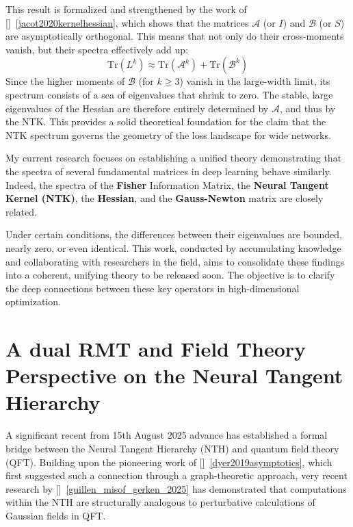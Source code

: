 This result is formalized and strengthened by the work of []~\ref{jacot2020kernelhessian}, which shows that the matrices $\mathcal{A}$ (or $I$) and $\mathcal{B}$ (or $S$) are asymptotically orthogonal. This means that not only do their cross-moments vanish, but their spectra effectively add up:
\begin{equation}
\mathrm{Tr}(L^k) \approx \mathrm{Tr}(\mathcal{A}^k) + \mathrm{Tr}(\mathcal{B}^k)
\end{equation}
Since the higher moments of $\mathcal{B}$ (for $k \ge 3$) vanish in the large-width limit, its spectrum consists of a sea of eigenvalues that shrink to zero. The stable, large eigenvalues of the Hessian are therefore entirely determined by $\mathcal{A}$, and thus by the NTK. This provides a solid theoretical foundation for the claim that the NTK spectrum governs the geometry of the loss landscape for wide networks.

\begin{tcolorbox}[colback=red!5,colframe=red!80!black,title={\textbf{Ongoing Research: Towards a Unified Spectral Theory}},enhanced,drop shadow,boxrule=2pt]
    My current research focuses on establishing a unified theory demonstrating that the spectra of several fundamental matrices in deep learning behave similarly. Indeed, the spectra of the \textbf{Fisher} Information Matrix, the \textbf{Neural Tangent Kernel (NTK)}, the \textbf{Hessian}, and the \textbf{Gauss-Newton} matrix are closely related.

    Under certain conditions, the differences between their eigenvalues are bounded, nearly zero, or even identical. This work, conducted by accumulating knowledge and collaborating with researchers in the field, aims to consolidate these findings into a coherent, unifying theory to be released soon. The objective is to clarify the deep connections between these key operators in high-dimensional optimization.
\end{tcolorbox}





\newpage

\section{A dual RMT and Field Theory Perspective on the Neural Tangent Hierarchy}

A significant recent from 15th August 2025 advance has established a formal bridge between the Neural Tangent Hierarchy (NTH) and quantum field theory (QFT). Building upon the pioneering work of []~\ref{dyer2019asymptotics}, which first suggested such a connection through a graph-theoretic approach, very recent research by []~\ref{guillen_misof_gerken_2025} has demonstrated that computations within the NTH are structurally analogous to perturbative calculations of Gaussian fields in QFT.

